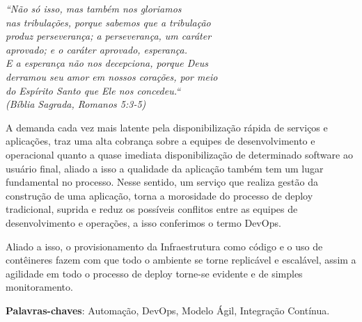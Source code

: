 \begin{epigrafe}
    \vspace*{\fill}
	\begin{flushright}
		\textit{``Não só isso, mas também nos gloriamos \\
			nas tribulações, porque sabemos que a tribulação\\
			produz perseverança; a perseverança, um caráter \\
			aprovado; e o caráter aprovado, esperança. \\
			E a esperança não nos decepciona, porque Deus \\
			derramou seu amor em nossos corações, por meio \\
			do Espírito Santo que Ele nos concedeu.``\\
			(Bíblia Sagrada, Romanos 5:3-5)}
			
	\end{flushright}
\end{epigrafe}


\setlength{\absparsep}{18pt} %
\begin{resumo}
A demanda cada vez mais latente pela disponibilização rápida de serviços e aplicações, traz uma alta cobrança sobre a equipes de desenvolvimento e operacional quanto a quase imediata disponibilização de determinado software ao usuário final, aliado a isso a qualidade da aplicação também tem um lugar fundamental no processo. Nesse sentido, um serviço que realiza gestão da construção de uma aplicação, torna a morosidade do processo de deploy tradicional, suprida e reduz os possíveis conflitos entre as equipes de desenvolvimento e operações, a isso conferimos o termo DevOps.

Aliado a isso, o provisionamento da Infraestrutura como código e o uso de contêineres fazem com que todo o ambiente se torne replicável e escalável, assim a agilidade em todo o processo de deploy torne-se evidente e de simples monitoramento.
 

 \textbf{Palavras-chaves}: Automação, DevOps, Modelo Ágil, Integração Contínua.
 
\end{resumo}




\listoffigures*

